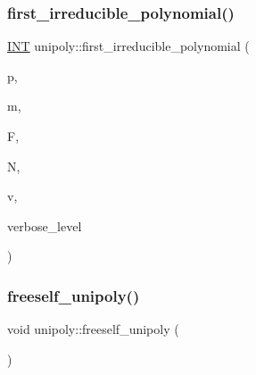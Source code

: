 \mbox{\label{classunipoly_a924960b8bdc1ba81f54703f5e8ed84ee}} 
\subsubsection{\texorpdfstring{first\+\_\+irreducible\+\_\+polynomial()}{first\_irreducible\_polynomial()}}
{\footnotesize\ttfamily \mbox{\hyperlink{galois_8h_a09fddde158a3a20bd2dcadb609de11dc}{I\+NT}} unipoly\+::first\+\_\+irreducible\+\_\+polynomial (\begin{DoxyParamCaption}\item[{\mbox{\hyperlink{galois_8h_a09fddde158a3a20bd2dcadb609de11dc}{I\+NT}}}]{p,  }\item[{\mbox{\hyperlink{classunipoly}{unipoly}} \&}]{m,  }\item[{\mbox{\hyperlink{classmatrix}{matrix}} \&}]{F,  }\item[{\mbox{\hyperlink{classmatrix}{matrix}} \&}]{N,  }\item[{\mbox{\hyperlink{class_vector}{Vector}} \&}]{v,  }\item[{\mbox{\hyperlink{galois_8h_a09fddde158a3a20bd2dcadb609de11dc}{I\+NT}}}]{verbose\+\_\+level }\end{DoxyParamCaption})}

\mbox{\label{classunipoly_aad315db6c6adb555a0c63877aab7d27e}} 
\subsubsection{\texorpdfstring{freeself\+\_\+unipoly()}{freeself\_unipoly()}}
{\footnotesize\ttfamily void unipoly\+::freeself\+\_\+unipoly (\begin{DoxyParamCaption}{ }\end{DoxyParamCaption})}

\mbox{\label{classunipoly_a14ae1863f2096e87f8115f5e8f727883}} 
